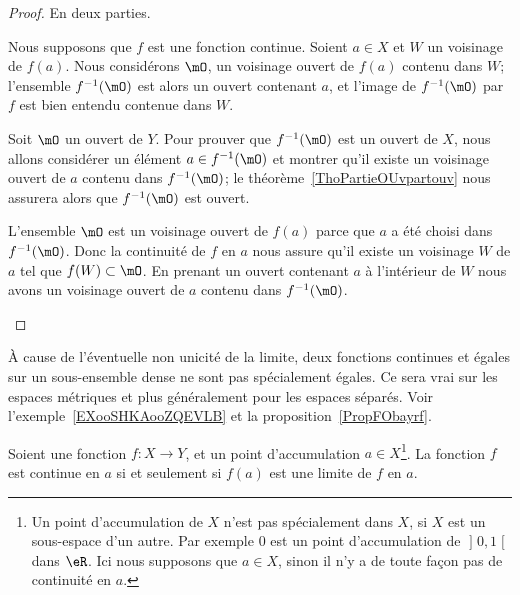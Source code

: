 \begin{proof}
	En deux parties.
	\begin{subproof}
		\spitem[\( \Rightarrow\)]
		Nous supposons que \( f\) est une fonction continue. Soient \( a\in X\) et \( W\) un voisinage de \( f(a)\). Nous considérons \( \mO\), un voisinage ouvert de \( f(a)\) contenu dans \( W\); l'ensemble \( f^{-1}(\mO)\) est alors un ouvert contenant \( a\), et l'image de \( f^{-1}(\mO)\) par \( f\) est bien entendu contenue dans \( W\).

		\spitem[\( \Leftarrow\)]
		Soit \( \mO\) un ouvert de \( Y\). Pour prouver que \( f^{-1}(\mO)\) est un ouvert de \( X\), nous allons considérer un élément \( a\in f^{-1}(\mO)\) et montrer qu'il existe un voisinage ouvert de \( a\) contenu dans \( f^{-1}(\mO)\); le théorème~\ref{ThoPartieOUvpartouv} nous assurera alors que \( f^{-1}(\mO)\) est ouvert.

		L'ensemble \( \mO\) est un voisinage ouvert de \( f(a)\) parce que \( a\) a été choisi dans \( f^{-1}(\mO)\). Donc la continuité de \( f\) en \( a\) nous assure qu'il existe un voisinage \( W\) de \( a\) tel que \( f(W)\subset\mO\). En prenant un ouvert contenant \( a\) à l'intérieur de \( W\) nous avons un voisinage ouvert de \( a\) contenu dans \( f^{-1}(\mO)\).
	\end{subproof}
\end{proof}

\begin{remark}
	À cause de l'éventuelle non unicité de la limite, deux fonctions continues et égales sur un sous-ensemble dense ne sont pas spécialement égales. Ce sera vrai sur les espaces métriques et plus généralement pour les espaces séparés. Voir l'exemple~\ref{EXooSHKAooZQEVLB} et la proposition~\ref{PropFObayrf}.
\end{remark}

\begin{lemma}  \label{LEMooCQQWooVSAWiy}
	Soient une fonction \( f\colon X\to Y\), et un point d'accumulation \( a\in X\)\footnote{Un point d'accumulation de \( X\) n'est pas spécialement dans \( X\), si \( X\) est un sous-espace d'un autre. Par exemple \( 0\) est un point d'accumulation de \( \mathopen] 0 , 1 \mathclose[\) dans \( \eR\). Ici nous supposons que \( a\in X\), sinon il n'y a de toute façon pas de continuité en \( a\).}. La fonction \( f\) est continue en \( a\) si et seulement si \( f(a)\) est une limite de \( f\) en \( a\).
\end{lemma}

